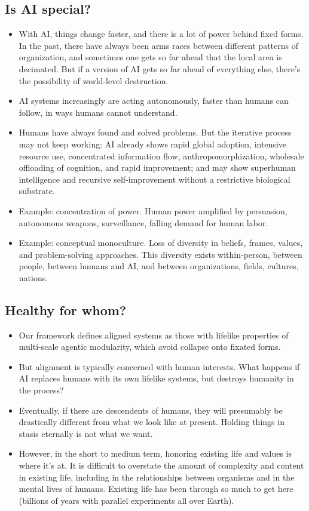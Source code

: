 \documentclass[11pt]{article}
\begin{document}
\subsection*{Is AI special?}
\begin{itemize}
  \item With AI, things change faster, and there is a lot of power behind fixed forms. In the past, there have always been arms races between different patterns of organization, and sometimes one gets so far ahead that the local area is decimated. But if a version of AI gets so far ahead of everything else, there's the possibility of world-level destruction.
  \item AI systems increasingly are acting autonomously, faster than humans can follow, in ways humans cannot understand.
  \item Humans have always found and solved problems. But the iterative process may not keep working: AI already shows rapid global adoption, intensive resource use, concentrated information flow, anthropomorphization, wholesale offloading of cognition, and rapid improvement; and may show superhuman intelligence and recursive self-improvement without a restrictive biological substrate.
  \item Example: concentration of power. Human power amplified by persuasion, autonomous weapons, surveillance, falling demand for human labor. 
  \item Example: conceptual monoculture. Loss of diversity in beliefs, frames, values, and problem-solving approaches. This diversity exists within-person, between people, between humans and AI, and between organizations, fields, cultures, nations.
\end{itemize}


\subsection*{Healthy for whom?}

\begin{itemize}
  \item Our framework defines aligned systems as those with lifelike properties of multi-scale agentic modularity, which avoid collapse onto fixated forms. 
  \item But alignment is typically concerned with human interests. What happens if AI replaces humans with its own lifelike systems, but destroys humanity in the process? 
  \item Eventually, if there are descendents of humans, they will presumably be drastically different from what we look like at present. Holding things in stasis eternally is not what we want. 
  \item However, in the short to medium term, honoring existing life and values is where it's at. It is difficult to overstate the amount of complexity and content in existing life, including in the relationships between organisms and in the mental lives of humans. Existing life has been through so much to get here (billions of years with parallel experiments all over Earth). 
\end{itemize}
\end{document}
